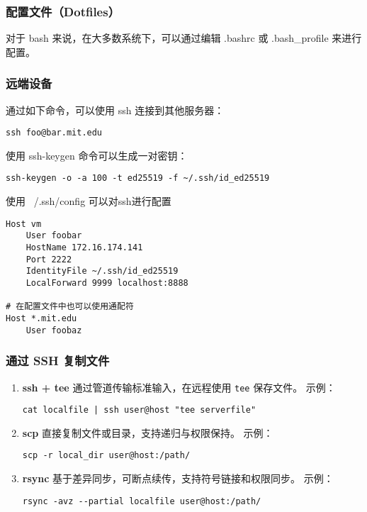 \documentclass[a4paper,12pt]{ctexart}
\begin{document}
\subsubsection{配置文件（Dotfiles）}
对于 bash 来说，在大多数系统下，可以通过编辑 .bashrc 或 .bash\_profile 来进行配置。

\subsubsection{远端设备}
通过如下命令，可以使用 ssh 连接到其他服务器：
\begin{lstlisting}
ssh foo@bar.mit.edu
\end{lstlisting}

使用 ssh-keygen 命令可以生成一对密钥：

\begin{lstlisting}
ssh-keygen -o -a 100 -t ed25519 -f ~/.ssh/id_ed25519
\end{lstlisting}

使用 ~/.ssh/config 可以对ssh进行配置

\begin{lstlisting}
Host vm
    User foobar
    HostName 172.16.174.141
    Port 2222
    IdentityFile ~/.ssh/id_ed25519
    LocalForward 9999 localhost:8888

# 在配置文件中也可以使用通配符
Host *.mit.edu
    User foobaz
\end{lstlisting}

\subsubsection{通过 SSH 复制文件}

\begin{enumerate}
  \item \textbf{ssh + tee}  
        通过管道传输标准输入，在远程使用 \texttt{tee} 保存文件。  
        示例：
        \begin{lstlisting}
cat localfile | ssh user@host "tee serverfile"
        \end{lstlisting}

  \item \textbf{scp}  
        直接复制文件或目录，支持递归与权限保持。  
        示例：
        \begin{lstlisting}
scp -r local_dir user@host:/path/
        \end{lstlisting}

  \item \textbf{rsync}  
        基于差异同步，可断点续传，支持符号链接和权限同步。  
        示例：
        \begin{lstlisting}
rsync -avz --partial localfile user@host:/path/
        \end{lstlisting}
\end{enumerate}
\end{document}
